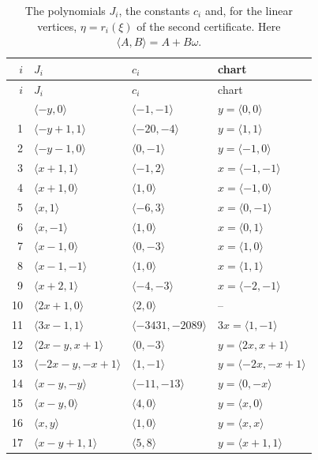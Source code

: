 \documentclass[11pt]{article}
\begin{document}
\begingroup\small
\setlength{\LTcapwidth}{\textwidth}
\begin{longtable}{@{}rlll@{}}
\caption{The polynomials $J_i$, the constants $c_i$ and, for the linear vertices, $\eta=r_i(\xi)$ of the second certificate. Here $\langle A,B\rangle=A+B\omega$.}\label{tab:cvert2}\\
\hline $i$ & $J_i$ & $c_i$ & chart\\\hline\endfirsthead\hline $i$ & $J_i$ & $c_i$ & chart\\\hline\endhead\hline\endfoot
0 & $\langle -y,0\rangle$ & $\langle -1,-1\rangle$ & $y=\langle 0,0\rangle$\\
1 & $\langle -y+1,1\rangle$ & $\langle -20,-4\rangle$ & $y=\langle 1,1\rangle$\\
2 & $\langle -y-1,0\rangle$ & $\langle 0,-1\rangle$ & $y=\langle -1,0\rangle$\\
3 & $\langle x+1,1\rangle$ & $\langle -1,2\rangle$ & $x=\langle -1,-1\rangle$\\
4 & $\langle x+1,0\rangle$ & $\langle 1,0\rangle$ & $x=\langle -1,0\rangle$\\
5 & $\langle x,1\rangle$ & $\langle -6,3\rangle$ & $x=\langle 0,-1\rangle$\\
6 & $\langle x,-1\rangle$ & $\langle 1,0\rangle$ & $x=\langle 0,1\rangle$\\
7 & $\langle x-1,0\rangle$ & $\langle 0,-3\rangle$ & $x=\langle 1,0\rangle$\\
8 & $\langle x-1,-1\rangle$ & $\langle 1,0\rangle$ & $x=\langle 1,1\rangle$\\
9 & $\langle x+2,1\rangle$ & $\langle -4,-3\rangle$ & $x=\langle -2,-1\rangle$\\
10 & $\langle 2x+1,0\rangle$ & $\langle 2,0\rangle$ & --\\
11 & $\langle 3x-1,1\rangle$ & $\langle -3431,-2089\rangle$ & $3x=\langle 1,-1\rangle$\\
12 & $\langle 2x-y,x+1\rangle$ & $\langle 0,-3\rangle$ & $y=\langle 2x,x+1\rangle$\\
13 & $\langle -2x-y,-x+1\rangle$ & $\langle 1,-1\rangle$ & $y=\langle -2x,-x+1\rangle$\\
14 & $\langle x-y,-y\rangle$ & $\langle -11,-13\rangle$ & $y=\langle 0,-x\rangle$\\
15 & $\langle x-y,0\rangle$ & $\langle 4,0\rangle$ & $y=\langle x,0\rangle$\\
16 & $\langle x,y\rangle$ & $\langle 1,0\rangle$ & $y=\langle x,x\rangle$\\
17 & $\langle x-y+1,1\rangle$ & $\langle 5,8\rangle$ & $y=\langle x+1,1\rangle$\\

\end{longtable}
\end{document}
